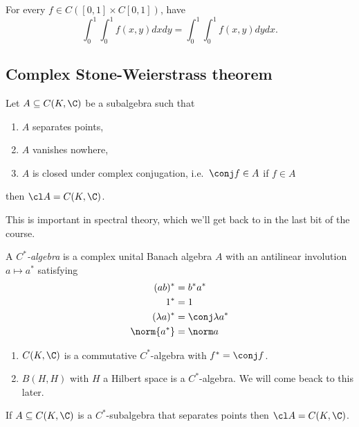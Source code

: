 \documentclass[a4paper]{article}
\begin{document}
\begin{corollary}
  For every \(f \in C([0, 1] \times C[0, 1])\), have
  \[
    \int_0^1 \int_0^1 f(x, y) dx dy = \int_0^1 \int_0^1 f(x, y) dy dx.
  \]
\end{corollary}

\subsection{Complex Stone-Weierstrass theorem}

\begin{theorem}
  Let \(A \subseteq C(K, \C)\) be a subalgebra such that
  \begin{enumerate}
  \item \(A\) separates points,
  \item \(A\) vanishes nowhere,
  \item \(A\) is closed under complex conjugation, i.e.\ \(\conj f \in A\) if \(f \in A\)
  \end{enumerate}
  then \(\cl A = C(K, \C)\).
\end{theorem}

This is important in spectral theory, which we'll get back to in the last bit of the course.

\begin{definition}[\(C^*\)-algebra]
  A \emph{\(C^*\)-algebra} is a complex unital Banach algebra \(A\) with an antilinear involution \(a \mapsto a^*\) satisfying
  \begin{align*}
    (ab)^* & = b^*a^* \\
    1^* &= 1 \\
    (\lambda a)^* &= \conj \lambda a^* \\
    \norm{a^*} &= \norm a
  \end{align*}
\end{definition}

\begin{eg}\leavevmode
  \begin{enumerate}
  \item \(C(K, \C)\) is a commutative \(C^*\)-algebra with \(f^* = \conj f\).
  \item \(B(H, H)\) with \(H\) a Hilbert space is a \(C^*\)-algebra. We will come beack to this later.
  \end{enumerate}
\end{eg}

\begin{corollary}
  If \(A \subseteq C(K, \C)\) is a \(C^*\)-subalgebra that separates points then \(\cl A = C(K, \C)\).
\end{corollary}
\end{document}
